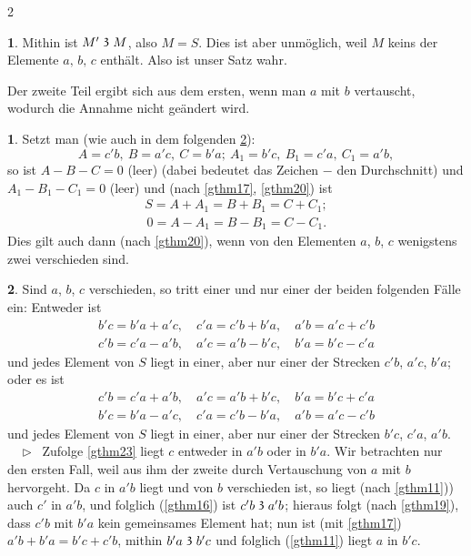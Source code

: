 \documentclass[leqno,hidelinks,10pt]{article}
\theoremstyle{definition}
\newtheorem{satz}{\protect\satzname}
\newtheorem*{zusatz}{\protect\zusatzname}
\newcommand{\satzname}{}
\newcommand{\zusatzname}{}
\renewcommand{\satzname}{\hspace{-4pt}.\ Satz}%
\renewcommand{\zusatzname}{Zusatz}%
\renewcommand{\satzname}{\hspace{-4pt}.\ Theorem}%
\renewcommand{\zusatzname}{Corollary}%
\newcommand\Beweis{\medskip \newline $ \phantom{'.'} \rhd \ $}%
\newcommand\TeilVon{\mathrel{\raisebox{0.45ex}{$\mathfrak{3}$}}}
\newcommand{\sref}[1]{\underline{\ref{#1}}}%
\begin{document}
\begin{paracol}{2}
\begin{leftcolumn}
\begin{satz}
Mithin ist $M' \TeilVon M$, also $M = S$. Dies ist aber unmöglich, weil $M$ keins
der Elemente $a,\, b,\, c$ enthält. Also ist unser Satz wahr.

Der zweite Teil ergibt sich aus dem ersten, wenn man $a$ mit $b$ vertauscht,
wodurch die Annahme nicht geändert wird.
\end{satz}

\begin{zusatz}\label{zusatz1}
Setzt man (wie auch in dem folgenden \sref{gthm25}):
\[
    A = c'b,\ B = a'c,\ C = b'a;\  A_1 = b'c,\ B_1 = c'a,\ C_1 = a'b,
\]
so ist $A - B - C = 0$ (leer) (dabei bedeutet das Zeichen $-$ den Durchschnitt)
 und $A_1 - B_1 - C_1 = 0$ (leer) und (nach \sref{gthm17}, \sref{gthm20}) ist
\begin{gather*}
    S = A + A_1 = B + B_1 = C + C_1; \\
    \,0 = A - A_1 = B - B_1 = C - C_1.
\end{gather*}
Dies gilt auch dann (nach \sref{gthm20}), wenn von den Elementen $a$, $b$, $c$
wenigstens zwei verschieden sind.
\end{zusatz}

\begin{satz}\label{gthm25}
Sind $a$, $b$, $c$ verschieden, so tritt einer und nur einer der beiden
folgenden Fälle ein: Entweder ist
\begin{gather*}
    b'c = b'a + a'c, \quad c'a = c'b + b'a, \quad a'b = a'c + c'b \\
    c'b = c'a - a'b, \quad a'c = a'b - b'c, \quad b'a = b'c - c'a
\end{gather*}
und jedes Element von $S$ liegt in einer, aber nur einer der Strecken
$c'b$, $a'c$, $b'a$; oder es ist
\begin{gather*}
    c'b = c'a + a'b, \quad a'c = a'b + b'c, \quad b'a = b'c + c'a \\
    b'c = b'a - a'c, \quad c'a = c'b - b'a, \quad a'b = a'c - c'b
\end{gather*}
und jedes Element von $S$ liegt in einer, aber nur einer der Strecken
$b'c$, $c'a$, $a'b$.
\Beweis
Zufolge \sref{gthm23} liegt $c$ entweder in $a'b$ oder in $b'a$. Wir betrachten
nur den ersten Fall, weil aus ihm der zweite durch Vertauschung von $a$ mit $b$
hervorgeht. Da $c$ in $a'b$ liegt und von $b$ verschieden ist, so liegt
(nach \sref{gthm11})) auch $c'$ in $a'b$, und folglich (\sref{gthm16}) ist
$c'b \TeilVon a'b$; hieraus folgt (nach \sref{gthm19}), dass $c'b$ mit $b'a$ kein
gemeinsames Element hat; nun ist (mit \sref{gthm17}) $a'b + b'a = b'c + c'b$,
mithin $b'a \TeilVon b'c$ und folglich (\sref{gthm11}) liegt $a$ in $b'c$.


\end{satz}
\end{leftcolumn}
\end{paracol}
\end{document}
